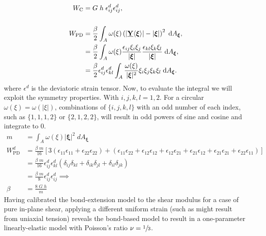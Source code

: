 %
\begin{align*}
    W_\text{C} &= G \; h \; \epsilon_{ij}^d \epsilon_{ij}^d,  \\  \\
    W_\text{PD} &= \frac{\beta}{2}\int_A \omega(\xi)\left(|\vstate{Y}{}{\boldsymbol{\xi}}|-|\boldsymbol{\xi}|\right)^2 \; {\rm d}A_{\boldsymbol{\xi}}, \\
    &=\frac{\beta}{2}\int_A  \omega(\xi) \frac{\epsilon_{ij}\xi_i \xi_j }{|\boldsymbol{\xi}|} \frac{\epsilon_{kl} \xi_k \xi_l }{|\boldsymbol{\xi}|}\;{\rm d}A_{\boldsymbol{\xi}},\\
    &=\frac{\beta}{2} \epsilon_{ij}^d \epsilon_{kl}^d \int_A \frac{ \omega(\xi)}{|\boldsymbol{\xi}|^2}\xi_i \xi_j \xi_k \xi_l \;{\rm d}A_{\boldsymbol{\xi}}.
\end{align*}
%
where $\epsilon^d$ is the deviatoric strain tensor.  Now, to evaluate the integral we will exploit the symmetry properties. With $i, j, k, l = 1,2$. For a circular $\omega(\xi) = \omega(|\xi|)$, combinations of $\{i,j,k,l\}$ with an odd number of each index, such as $\{1,1,1,2\}$ or $\{2,1,2,2\}$, will result in odd powers of sine and cosine and integrate to 0.
%
\begin{align*}
    m &= \int_A \omega(\xi)|\boldsymbol{\xi}|^2\; dA_{\boldsymbol{\xi}} \\
    W^d_\text{PD} &= \frac{\beta \; m}{16}[3(\epsilon_{11}\epsilon_{11}+\epsilon_{22}\epsilon_{22})+(\epsilon_{11}\epsilon_{22}+\epsilon_{12}\epsilon_{12}+\epsilon_{12}\epsilon_{21}+\epsilon_{21}\epsilon_{12}+\epsilon_{21}\epsilon_{21}+\epsilon_{22}\epsilon_{11})]\\
    &= \frac{\beta \; m}{16} \epsilon_{ij}^d \epsilon_{kl}^d (\delta_{ij}\delta_{kl}+\delta_{ik}\delta_{jl}+\delta_{il}\delta_{jk})\\
    &= \frac{\beta \; m}{8} \epsilon_{ij}^d \epsilon_{ij}^d \implies\\
     \beta &= \frac{8 \; G\;h}{m}
\end{align*}
%
Having calibrated the bond-extension model to the shear modulus for a case of pure in-plane shear, applying a different uniform strain (such as might result from uniaxial tension) reveals the bond-based model to result in a one-parameter linearly-elastic model with Poisson's ratio \(\nu=\sfrac{1}{3}\).  

